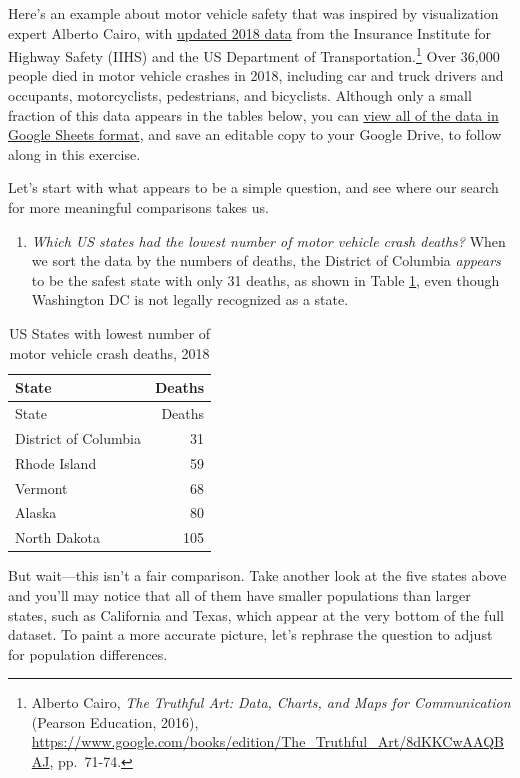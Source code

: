 \documentclass[
  english,
]{book}
\providecommand{\tightlist}{%
  \setlength{\itemsep}{0pt}\setlength{\parskip}{0pt}}
\begin{document}
Here's an example about motor vehicle safety that was inspired by visualization expert Alberto Cairo, with \href{https://www.iihs.org/topics/fatality-statistics/detail/state-by-state}{updated 2018 data} from the Insurance Institute for Highway Safety (IIHS) and the US Department of Transportation.\footnote{Alberto Cairo, \emph{The {Truthful Art}: {Data}, {Charts}, and {Maps} for {Communication}} ({Pearson Education}, 2016), \url{https://www.google.com/books/edition/The_Truthful_Art/8dKKCwAAQBAJ}, pp.~71-74.} Over 36,000 people died in motor vehicle crashes in 2018, including car and truck drivers and occupants, motorcyclists, pedestrians, and bicyclists. Although only a small fraction of this data appears in the tables below, you can \href{https://docs.google.com/spreadsheets/d/1N7_pHdmXdE3Y4ECnnDyBTSXkklv-u1hLULSO-YaotpA/edit\#gid=0}{view all of the data in Google Sheets format}, and save an editable copy to your Google Drive, to follow along in this exercise.

Let's start with what appears to be a simple question, and see where our search for more meaningful comparisons takes us.

\begin{enumerate}
\def\labelenumi{\arabic{enumi}.}
\tightlist
\item
  \emph{Which US states had the lowest number of motor vehicle crash deaths?} When we sort the data by the numbers of deaths, the District of Columbia \emph{appears} to be the safest state with only 31 deaths, as shown in Table \ref{tab:deaths}, even though Washington DC is not legally recognized as a state.
\end{enumerate}

\begin{longtable}[]{@{}lr@{}}
\caption{\label{tab:deaths} US States with lowest number of motor vehicle crash deaths, 2018}\tabularnewline
\toprule
State & Deaths \\
\midrule
\endfirsthead
\toprule
State & Deaths \\
\midrule
\endhead
District of Columbia & 31 \\
Rhode Island & 59 \\
Vermont & 68 \\
Alaska & 80 \\
North Dakota & 105 \\
\bottomrule
\end{longtable}

But wait---this isn't a fair comparison. Take another look at the five states above and you'll may notice that all of them have smaller populations than larger states, such as California and Texas, which appear at the very bottom of the full dataset. To paint a more accurate picture, let's rephrase the question to adjust for population differences.
\end{document}
